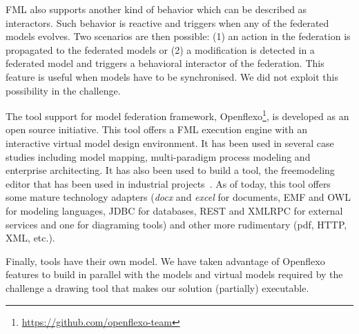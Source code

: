 FML also supports another kind of behavior which can be described as
interactors. Such behavior is reactive and triggers when any of the
federated models evolves. Two scenarios are then possible: (1) an
action in the federation is propagated to the federated models or (2)
a modification is detected in a federated model and triggers a
behavioral interactor of the federation.
This feature is useful when models have to be synchronised. We did not
exploit this possibility in the challenge.

The tool support for model federation framework,
Openflexo\footnote{\url{https://github.com/openflexo-team}}, is
developed as an open source initiative. This tool offers a FML
execution engine with an interactive virtual model design environment.
It has been used in several case studies including model mapping,
multi-paradigm process modeling and enterprise architecting. It has
also been used to build a tool, the freemodeling editor that has been
used in industrial projects~\cite{models2016-freemodel}. As of today, this tool
offers some mature technology adapters (\emph{docx} and \emph{excel}
for documents, EMF and OWL for modeling languages, JDBC for databases,
REST and XMLRPC for external services and one for diagraming tools)
and other more rudimentary (pdf, HTTP, XML, etc.).

Finally, tools have their own model. We have taken advantage of
Openflexo features to build in parallel with the models and virtual
models required by the challenge a drawing tool that makes our
solution (partially) executable.
